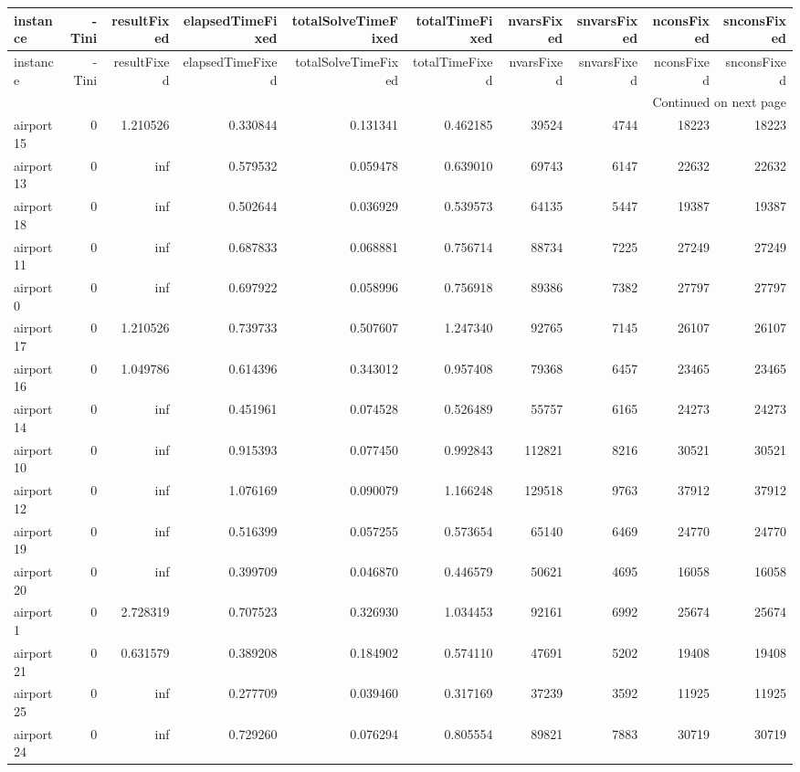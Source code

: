 
\begin{longtable}{|l|r|r|r|r|r|r|r|r|r|}
\toprule
instance & -Tini & resultFixed & elapsedTimeFixed & totalSolveTimeFixed & totalTimeFixed & nvarsFixed & snvarsFixed & nconsFixed & snconsFixed \\
\midrule
\endfirsthead
\toprule
instance & -Tini & resultFixed & elapsedTimeFixed & totalSolveTimeFixed & totalTimeFixed & nvarsFixed & snvarsFixed & nconsFixed & snconsFixed \\
\midrule
\endhead
\midrule
\multicolumn{10}{r}{Continued on next page} \\
\midrule
\endfoot
\bottomrule
\endlastfoot
airport15 & 0 & 1.210526 & 0.330844 & 0.131341 & 0.462185 & 39524 & 4744 & 18223 & 18223 \\
airport13 & 0 & inf & 0.579532 & 0.059478 & 0.639010 & 69743 & 6147 & 22632 & 22632 \\
airport18 & 0 & inf & 0.502644 & 0.036929 & 0.539573 & 64135 & 5447 & 19387 & 19387 \\
airport11 & 0 & inf & 0.687833 & 0.068881 & 0.756714 & 88734 & 7225 & 27249 & 27249 \\
airport0 & 0 & inf & 0.697922 & 0.058996 & 0.756918 & 89386 & 7382 & 27797 & 27797 \\
airport17 & 0 & 1.210526 & 0.739733 & 0.507607 & 1.247340 & 92765 & 7145 & 26107 & 26107 \\
airport16 & 0 & 1.049786 & 0.614396 & 0.343012 & 0.957408 & 79368 & 6457 & 23465 & 23465 \\
airport14 & 0 & inf & 0.451961 & 0.074528 & 0.526489 & 55757 & 6165 & 24273 & 24273 \\
airport10 & 0 & inf & 0.915393 & 0.077450 & 0.992843 & 112821 & 8216 & 30521 & 30521 \\
airport12 & 0 & inf & 1.076169 & 0.090079 & 1.166248 & 129518 & 9763 & 37912 & 37912 \\
airport19 & 0 & inf & 0.516399 & 0.057255 & 0.573654 & 65140 & 6469 & 24770 & 24770 \\
airport20 & 0 & inf & 0.399709 & 0.046870 & 0.446579 & 50621 & 4695 & 16058 & 16058 \\
airport1 & 0 & 2.728319 & 0.707523 & 0.326930 & 1.034453 & 92161 & 6992 & 25674 & 25674 \\
airport21 & 0 & 0.631579 & 0.389208 & 0.184902 & 0.574110 & 47691 & 5202 & 19408 & 19408 \\
airport25 & 0 & inf & 0.277709 & 0.039460 & 0.317169 & 37239 & 3592 & 11925 & 11925 \\
airport24 & 0 & inf & 0.729260 & 0.076294 & 0.805554 & 89821 & 7883 & 30719 & 30719 \\

\end{longtable}
